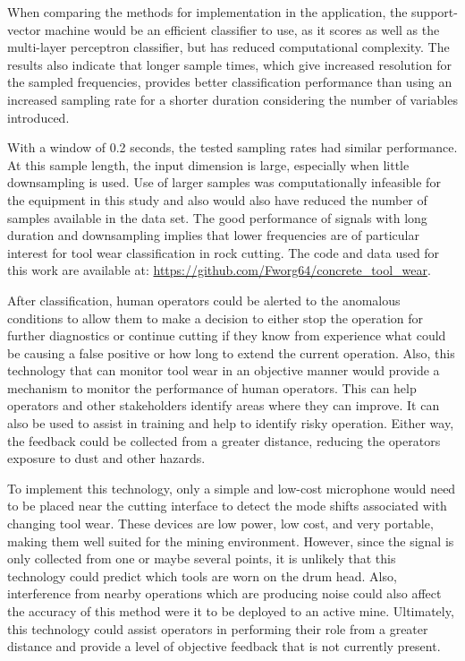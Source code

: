 When comparing the methods for implementation in the application, the support-vector machine
would be an efficient classifier to use, as it scores as well as the multi-layer perceptron classifier,
but has reduced computational complexity. The results also indicate that longer sample times, 
which give increased resolution for the sampled frequencies, provides better classification performance 
than using an increased sampling rate for a shorter duration considering the number of variables introduced.

With a window of 0.2 seconds, the tested sampling rates had similar performance.
At this sample length, the input dimension is large, especially when little downsampling is used.
Use of larger samples was computationally infeasible for the equipment in this study and 
also would also have reduced the number of samples available in the data set.
The good performance of signals with long duration and downsampling
implies that lower frequencies are of particular interest for tool wear classification in rock cutting.
The code and data used for this work are available at:
\url{https://github.com/Fworg64/concrete_tool_wear}.

After classification, human operators could be alerted to the anomalous conditions 
to allow them to make a decision to either stop the operation
for further diagnostics or continue cutting if they know from experience 
what could be causing a false positive or how long to extend the current operation.
Also, this technology that can monitor tool wear in an objective manner
would provide a mechanism to monitor the performance of human operators. 
This can help operators and other stakeholders identify areas where they can improve.
It can also be used to assist in training and help to identify risky operation.
Either way, the feedback could be collected from a greater distance, 
reducing the operators exposure to dust and other hazards.

To implement this technology, only a simple and low-cost microphone would need to be placed near
the cutting interface to detect the mode shifts associated with changing tool wear. These devices
are low power, low cost, and very portable, making them well suited for the mining environment.
However, since the signal is only collected from one or maybe several points, it is unlikely that
this technology could predict which tools are worn on the drum head. Also, interference from nearby
operations which are producing noise could also affect the accuracy of this method were it to be
deployed to an active mine. Ultimately, this technology could assist operators in performing their
role from a greater distance and provide a level of objective feedback that is not currently present.


